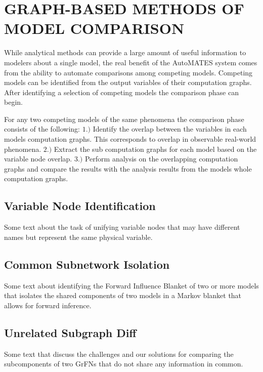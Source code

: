 \chapter{GRAPH-BASED METHODS OF MODEL COMPARISON\label{chapter:comparison}}

While analytical methods can provide a large amount of useful information to modelers about a single model, the real benefit of the AutoMATES system comes from the ability to automate comparisons among competing models. Competing models can be identified from the output variables of their computation graphs. After identifying a selection of competing models the comparison phase can begin.

For any two competing models of the same phenomena the comparison phase consists of the following:
$1.)$ Identify the overlap between the variables in each models computation graphs. This corresponds to overlap in observable real-world phenomena.
$2.)$ Extract the sub computation graphs for each model based on the variable node overlap.
$3.)$ Perform analysis on the overlapping computation graphs and compare the results with the analysis results from the models whole computation graphs.

\section{Variable Node Identification\label{sec:var_ident}}

Some text about the task of unifying variable nodes that may have different names but represent the same physical variable.

\section{Common Subnetwork Isolation\label{sec:subnet_iso}}

Some text about identifying the Forward Influence Blanket of two or more models that isolates the shared components of two models in a Markov blanket that allows for forward inference.

\section{Unrelated Subgraph Diff\label{sec:unrelated_diff}}

Some text that discuss the challenges and our solutions for comparing the subcomponents of two GrFNs that do not share any information in common.
